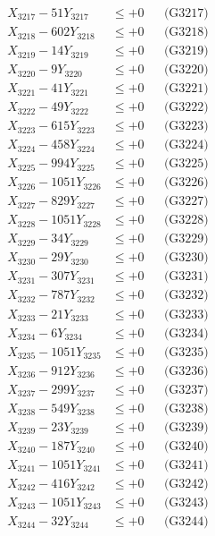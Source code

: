 \documentclass[a4paper,10pt]{article}
\begin{document}
{\begin{align}
X_{3217} - 51Y_{3217} &\leq +0 && \text{(G3217)} \\
X_{3218} - 602Y_{3218} &\leq +0 && \text{(G3218)} \\
X_{3219} - 14Y_{3219} &\leq +0 && \text{(G3219)} \\
X_{3220} - 9Y_{3220} &\leq +0 && \text{(G3220)} \\
\allowbreak
X_{3221} - 41Y_{3221} &\leq +0 && \text{(G3221)} \\
X_{3222} - 49Y_{3222} &\leq +0 && \text{(G3222)} \\
X_{3223} - 615Y_{3223} &\leq +0 && \text{(G3223)} \\
X_{3224} - 458Y_{3224} &\leq +0 && \text{(G3224)} \\
X_{3225} - 994Y_{3225} &\leq +0 && \text{(G3225)} \\
X_{3226} - 1051Y_{3226} &\leq +0 && \text{(G3226)} \\
X_{3227} - 829Y_{3227} &\leq +0 && \text{(G3227)} \\
X_{3228} - 1051Y_{3228} &\leq +0 && \text{(G3228)} \\
X_{3229} - 34Y_{3229} &\leq +0 && \text{(G3229)} \\
X_{3230} - 29Y_{3230} &\leq +0 && \text{(G3230)} \\
\allowbreak
X_{3231} - 307Y_{3231} &\leq +0 && \text{(G3231)} \\
X_{3232} - 787Y_{3232} &\leq +0 && \text{(G3232)} \\
X_{3233} - 21Y_{3233} &\leq +0 && \text{(G3233)} \\
X_{3234} - 6Y_{3234} &\leq +0 && \text{(G3234)} \\
X_{3235} - 1051Y_{3235} &\leq +0 && \text{(G3235)} \\
X_{3236} - 912Y_{3236} &\leq +0 && \text{(G3236)} \\
X_{3237} - 299Y_{3237} &\leq +0 && \text{(G3237)} \\
X_{3238} - 549Y_{3238} &\leq +0 && \text{(G3238)} \\
X_{3239} - 23Y_{3239} &\leq +0 && \text{(G3239)} \\
X_{3240} - 187Y_{3240} &\leq +0 && \text{(G3240)} \\
\allowbreak
X_{3241} - 1051Y_{3241} &\leq +0 && \text{(G3241)} \\
X_{3242} - 416Y_{3242} &\leq +0 && \text{(G3242)} \\
X_{3243} - 1051Y_{3243} &\leq +0 && \text{(G3243)} \\
X_{3244} - 32Y_{3244} &\leq +0 && \text{(G3244)} \\

\end{align}}
\end{document}
